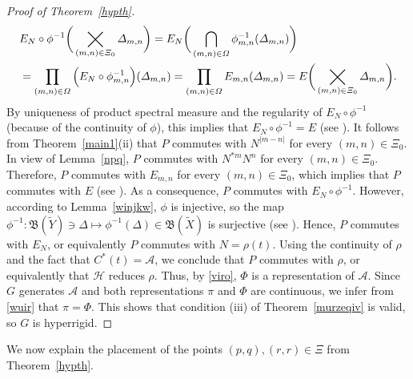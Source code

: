 \documentclass[reqno]{amsproc}
\DeclareMathOperator*{\bigcross}{\bigCross}
\numberwithin{equation}{section}
\theoremstyle{remark}
\newcommand*{\ascr}{\mathscr{A}}
\newcommand*{\hh}{\mathcal{H}}
\newcommand{\bigCross}{\mathbin{\tikz [x=1.55ex,y=1.55ex,line width=.18ex,
   baseline={([yshift=-0.55ex]current bounding
   box.center)}]
   \draw (-1,-1) -- (1,1) (-1,1) -- (1,-1);}}%
\newcommand*{\borel}{\mathfrak{B}}
\theoremstyle{definition}
\begin{document}
\begin{proof}[Proof of Theorem~\ref{hypth}]
   \begin{align*}
& E_N \circ \phi^{-1} \bigg(\bigcross_{(m,n)\in
\varXi_0} \varDelta_{m,n}\bigg) = E_N
\bigg(\bigcap_{(m,n)\in \varOmega} \phi_{m,n}^{-1}
(\varDelta_{m,n})\bigg)
   \\
&= \prod_{(m,n)\in \varOmega} \Big(E_N \circ
\phi_{m,n}^{-1}\Big) (\varDelta_{m,n}) =
\prod_{(m,n)\in \varOmega} E_{m,n} (\varDelta_{m,n}) =
E \bigg(\bigcross_{(m,n)\in \varXi_0}
\varDelta_{m,n}\bigg).
   \end{align*}
By uniqueness of product spectral measure and the
regularity of $E_N \circ \phi^{-1}$ (because of the
continuity of $\phi$), this implies that $E_N \circ
\phi^{-1}=E$ (see \cite[Proposition~4]{Sto87}). It
follows from Theorem~\ref{main1}(ii) that $P$ commutes
with $N^{|m-n|}$ for every $(m,n)\in \varXi_0$. In
view of Lemma~\ref{npq}, $P$ commutes with $N^{*m}N^n$
for every $(m,n)\in \varXi_0$. Therefore, $P$ commutes
with $E_{m,n}$ for every $(m,n)\in \varXi_0$, which
implies that $P$ commutes with $E$ (see
\cite[Proposition~4]{Sto87}). As a consequence, $P$
commutes with $E_N \circ \phi^{-1}$. However,
according to Lemma~\ref{winjkw}, $\phi$ is injective,
so the map $\phi^{-1} \colon \borel(\tilde Y) \ni
\varDelta \mapsto \phi^{-1}(\varDelta)\in
\borel(\tilde X)$ is surjective (see
\cite[Proposition~16]{C-S-s19}). Hence, $P$ commutes
with $E_N$, or equivalently $P$ commutes with
$N=\rho(t)$. Using the continuity of $\rho$ and the
fact that $C^*(t)=\ascr$, we conclude that $P$
commutes with $\rho$, or equivalently that $\hh$
reduces $\rho$. Thus, by \eqref{viro}, $\varPhi$ is a
representation of $\ascr$. Since $ G$ generates
$\ascr$ and both representations $\pi$ and $\varPhi$
are continuous, we infer from \eqref{wuir} that
$\pi=\varPhi$. This shows that condition (iii) of
Theorem~\ref{murzeqiv} is valid, so $G$ is hyperrigid.
   \end{proof}
We now explain the placement of the points $(p,q),
(r,r) \in \varXi$ from Theorem~\ref{hypth}.
\end{document}
